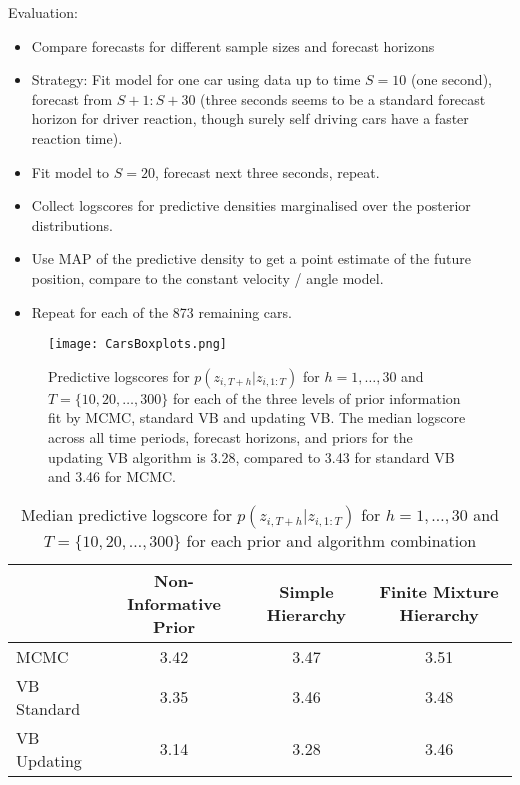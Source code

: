 \documentclass[12pt,a4paper]{article}\usepackage[]{graphicx}\usepackage[]{color}
\begin{document}
Evaluation:
\begin{itemize}
\item Compare forecasts for different sample sizes and forecast horizons
\item Strategy: Fit model for one car using data up to time $S = 10$ (one second), forecast from $S+1:S+30$ (three seconds seems to be a standard forecast horizon for driver reaction, though surely self driving cars have a faster reaction time).
\item Fit model to $S = 20$, forecast next three seconds, repeat.
\item Collect logscores for predictive densities marginalised over the posterior distributions.
\item Use MAP of the predictive density to get a point estimate of the future position, compare to the constant velocity / angle model.
\item Repeat for each of the 873 remaining cars.
\end{itemize}

\begin{figure}[ht]
\centering
\texttt{[image: CarsBoxplots.png]}
\caption{Predictive logscores for $p(z_{i, T+h} | z_{i, 1:T})$ for $h = 1, \dots, 30$ and $T = \{10, 20, \dots, 300\}$ for each of the three levels of prior information fit by MCMC, standard VB and updating VB. The median logscore across all time periods, forecast horizons, and priors for the updating VB algorithm is 3.28, compared to 3.43 for standard VB and 3.46 for MCMC.}
\label{fig:MainResults}
\end{figure}

\begin{center}
\begin{table}[h]
\begin{tabular}{| l | c | c | c |}
\hline
& Non-Informative Prior & Simple Hierarchy & Finite Mixture Hierarchy \\
\hline
MCMC & 3.42 & 3.47 & 3.51 \\
VB Standard & 3.35 & 3.46 & 3.48 \\
VB Updating & 3.14 & 3.28 & 3.46 \\
\hline
\end{tabular}
\label{tableMedian}
\caption{Median predictive logscore for $p(z_{i, T+h} | z_{i, 1:T})$ for $h = 1, \dots, 30$ and $T = \{10, 20, \dots, 300\}$ for each prior and algorithm combination}
\end{table}
\end{center}
\end{document}

